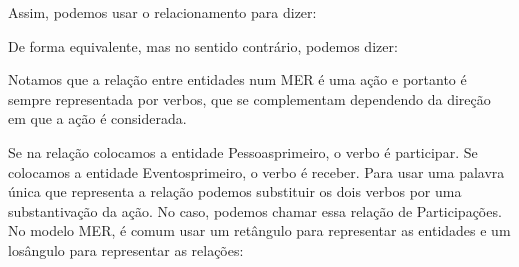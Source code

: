 \documentclass[
12pt,		%
openright,	%
twoside,  %
a4paper,			%
chapter=TITLE,		%
english,			%
french,				%
spanish,			%
brazil				%
]{USPSC-classe/USPSC_RedarTex}
\begin{document}
Assim, podemos usar o relacionamento para dizer:









\noindent\begin{center}\mbox{\centering{}}\end{center}


De forma equivalente, mas no sentido contr\'ario, podemos dizer:









\noindent\begin{center}\mbox{\centering{}}\end{center}


Notamos que a rela\c{c}\~ao entre entidades num MER \'e uma a\c{c}\~ao e portanto \'e sempre representada por verbos, que se complementam dependendo da dire\c{c}\~ao em que a a\c{c}\~ao \'e considerada.








Se na rela\c{c}\~ao colocamos a entidade \textquotedbl Pessoas\textquotedbl  primeiro, o verbo \'e participar. Se colocamos a entidade \textquotedbl Eventos\textquotedbl  primeiro, o verbo \'e receber. Para usar uma palavra \'unica que representa a rela\c{c}\~ao podemos substituir os dois verbos por uma substantiva\c{c}\~ao da a\c{c}\~ao. No caso, podemos chamar essa rela\c{c}\~ao de \textquotedbl Participa\c{c}\~oes\textquotedbl . No modelo MER, \'e comum usar um ret\^angulo para representar as entidades e um los\^angulo para representar as rela\c{c}\~oes:
\end{document}
